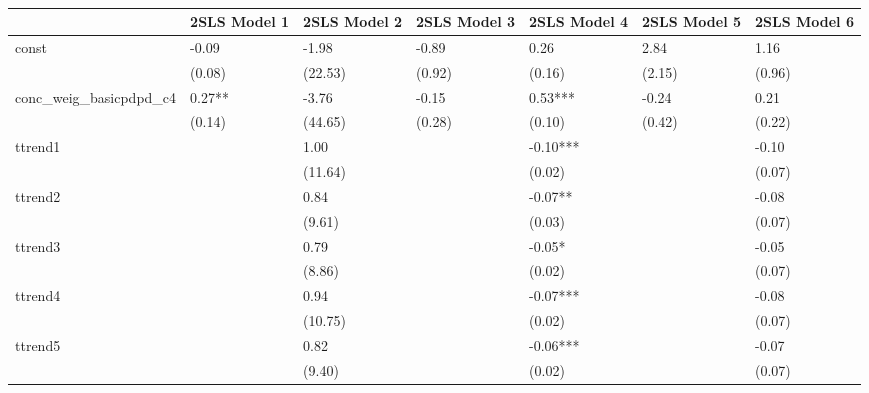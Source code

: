 \begin{table}
\caption{}
\label{}
\begin{center}
\begin{tabular}{lllllll}
\hline
                            & 2SLS Model 1 & 2SLS Model 2 & 2SLS Model 3 & 2SLS Model 4 & 2SLS Model 5 & 2SLS Model 6  \\
\hline
const                       & -0.09        & -1.98        & -0.89        & 0.26         & 2.84         & 1.16          \\
                            & (0.08)       & (22.53)      & (0.92)       & (0.16)       & (2.15)       & (0.96)        \\
conc\_weig\_basicpdpd\_c4   & 0.27**       & -3.76        & -0.15        & 0.53***      & -0.24        & 0.21          \\
                            & (0.14)       & (44.65)      & (0.28)       & (0.10)       & (0.42)       & (0.22)        \\
ttrend1                     &              & 1.00         &              & -0.10***     &              & -0.10         \\
                            &              & (11.64)      &              & (0.02)       &              & (0.07)        \\
ttrend2                     &              & 0.84         &              & -0.07**      &              & -0.08         \\
                            &              & (9.61)       &              & (0.03)       &              & (0.07)        \\
ttrend3                     &              & 0.79         &              & -0.05*       &              & -0.05         \\
                            &              & (8.86)       &              & (0.02)       &              & (0.07)        \\
ttrend4                     &              & 0.94         &              & -0.07***     &              & -0.08         \\
                            &              & (10.75)      &              & (0.02)       &              & (0.07)        \\
ttrend5                     &              & 0.82         &              & -0.06***     &              & -0.07         \\
                            &              & (9.40)       &              & (0.02)       &              & (0.07)        \\

\end{tabular}
\end{center}
\end{table}
